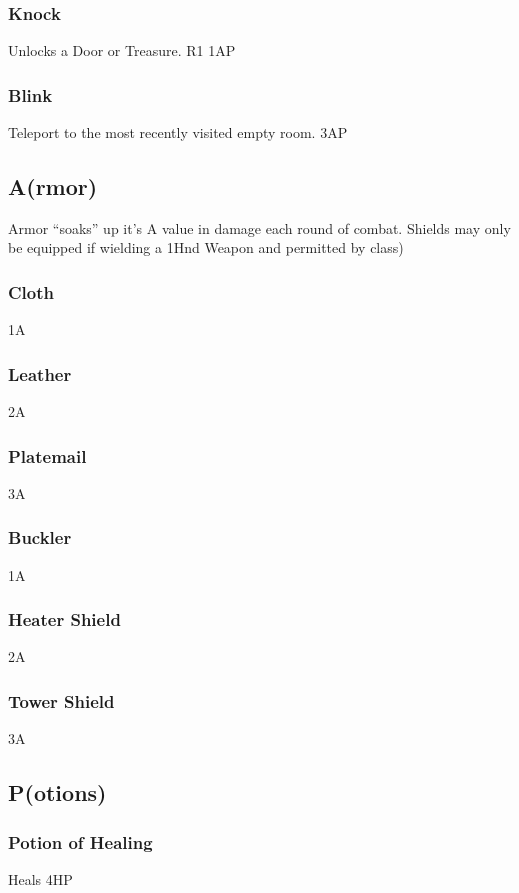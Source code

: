 \documentclass[a6paper,hidelinks]{article}
\begin{document}
\subsubsection{Knock}
Unlocks a Door or Treasure. R1 1AP

\subsubsection{Blink}
Teleport to the most recently visited empty room. 3AP

\subsection{A(rmor)}

Armor ``soaks'' up it’s A value in damage each round of combat. Shields may only be equipped if wielding a 1Hnd Weapon and permitted by class)

\subsubsection{Cloth}
1A

\subsubsection{Leather}
2A

\subsubsection{Platemail}
3A

\subsubsection{Buckler}
1A

\subsubsection{Heater Shield}
2A

\subsubsection{Tower Shield}
3A

\subsection{P(otions)}

\subsubsection{Potion of Healing}
Heals 4HP
\end{document}
